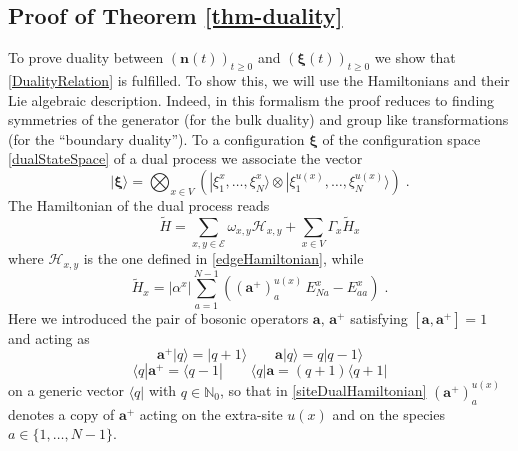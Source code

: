 \documentclass[10pt]{article}
\numberwithin{equation}{section}
\numberwithin{equation}{subsection}
\newcommand{\dt}{\;.}
\begin{document}
\subsection{Proof of Theorem \ref{thm-duality}}
\label{proof-th-duality}
To prove duality between $(\bm{n}(t))_{t\geq 0}$ and $(\bm{\xi}(t))_{t\geq 0}$ we  show that \eqref{DualityRelation} is fulfilled.  To show this, we will use the Hamiltonians and their Lie algebraic description. Indeed, in this formalism the proof 
reduces to finding symmetries of the generator (for the bulk duality) and group like transformations (for the ``boundary duality'').
To a configuration $\bm{\xi}$ of the configuration space  \eqref{dualStateSpace} of a dual process we associate the vector
\begin{equation}
    |\bm{\xi}\rangle=\bigotimes_{x\in V}\left(|\xi_{1}^{x},\ldots,\xi_{N}^{x}\rangle\otimes |\xi_{1}^{u(x)},\ldots,\xi_{N}^{u(x)}\rangle\right)\dt
\end{equation}
The Hamiltonian of the dual process reads
\begin{equation}\label{DualHamiltonian}
    \widetilde{H}=\sum_{x,y\in \mathcal{E}}\omega_{x,y}\mathcal{H}_{x,y}+\sum_{x\in V}\Gamma_{x}\widetilde{H}_{x}
\end{equation}
where $\mathcal{H}_{x,y}$ is the one defined in \eqref{edgeHamiltonian}, while 
\begin{equation}\label{siteDualHamiltonian}
    \widetilde{H}_{x}=|\alpha^{x}|\sum_{a=1}^{N-1}\left((\mathbf{a}^{+})_{a}^{u(x)}\,E_{Na}^{x}-E_{aa}^{x}\right)\dt
\end{equation}
Here we introduced the pair of bosonic operators $\mathbf{a},\,\mathbf{a}^{+}$ satisfying $[\mathbf{a},\mathbf{a}^{+}]=1$ and acting as
\begin{equation}
	\mathbf{a}^{+}|q\rangle=|q+1\rangle\qquad \mathbf{a}|q\rangle=q|q-1\rangle
\end{equation}
\begin{equation}
	\langle q|\mathbf{a}^{+}=\langle q-1|\qquad \langle q|\mathbf{a}=(q+1) \langle q+1|
\end{equation}
on a generic vector $\langle q|$ with $q\in \mathbb{N}_{0}$, so that in \eqref{siteDualHamiltonian} 
$(\mathbf{a}^{+})_{a}^{u(x)}$ denotes a copy of $\mathbf{a}^{+}$ acting on the extra-site $u(x)$ and on the species $a\in\{1,\ldots,N-1\}$. \\
\end{document}
